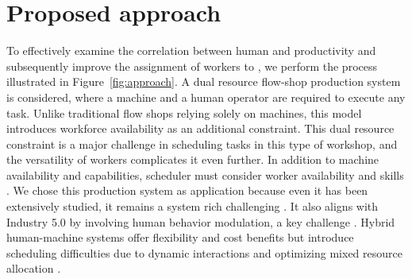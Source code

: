 \documentclass[review,12pt, 3p, times]{elsarticle}
\begin{document}

\section{Proposed approach }\label{sec:approach1}
To effectively examine the correlation between human  and productivity and subsequently improve the assignment of workers to , we perform the process illustrated in Figure~\ref{fig:approach}. 
A dual resource flow-shop production system is considered, where a machine and a human operator are required to execute any task. Unlike traditional flow shops relying solely on machines, this model introduces workforce availability as an additional constraint. This dual resource constraint is a major challenge in scheduling tasks in this type of workshop, and the versatility of workers complicates it even further. In addition to machine availability and capabilities, scheduler must consider worker availability and skills \cite{dhiflaoui2018dual}. We chose this production system as  application because even  it has been extensively studied, it remains a system rich   challenging  \cite{elkosantini2009integration, dhiflaoui2018dual}. It also aligns with Industry 5.0 by involving human behavior modulation, a key challenge \cite{battini2022towards}. Hybrid human-machine systems offer flexibility and cost benefits but introduce scheduling difficulties due to dynamic interactions and optimizing mixed resource allocation \cite{elkosantini2009integration,costa2020solving}.
\end{document}
